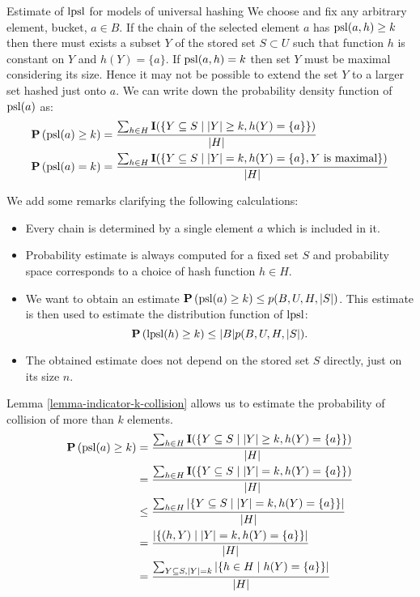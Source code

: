 \begin{section}{Estimate of $\mathrm{lpsl}$ for models of universal hashing}
We choose and fix any arbitrary element, bucket, $a \in B$. If the chain of the selected element $a$ has $\mathrm{psl}(a, h) \geq k$ then there must exists a subset $Y$ of the stored set $S \subset U$ such that function $h$ is constant on $Y$ and $h(Y) = \{ a \}$. If $\mathrm{psl}(a, h) = k$ then set $Y$ must be maximal considering its size. Hence it may not be possible to extend the set $Y$ to a larger set hashed just onto $a$. We can write down the probability density function of $\mathrm{psl}(a)$ as:
\begin{displaymath}
\begin{split}
\mathbf{P}\left(\mathrm{psl}(a) \geq k\right) & = \frac{\sum\displaylimits_{h \in H} \mathbf{I}(\{ Y \subseteq S \mid |Y| \geq k, h(Y) = \{ a \} \})}{|H|} \\
\mathbf{P}\left(\mathrm{psl}(a) = k\right) & = \frac{\sum\displaylimits_{h \in H} \mathbf{I}(\{ Y \subseteq S \mid |Y| = k, h(Y) = \{ a \}, Y \text{ is maximal} \})}{|H|} \\
\end{split}
\end{displaymath}

We add some remarks clarifying the following calculations:
\begin{itemize}
\item Every chain is determined by a single element $a$ which is included in it.
\item Probability estimate is always computed for a fixed set $S$ and probability space corresponds to a choice of hash function $h \in H$.
\item We want to obtain an estimate $\mathbf{P}\left(\mathrm{psl}(a) \geq k\right) \leq p(B, U, H, |S|)$. This estimate is then used to estimate the distribution function of $\mathrm{lpsl}$: \[ \mathbf{P}\left(\mathrm{lpsl}(h) \geq k\right) \leq |B| p(B, U, H, |S|) \text{.} \] 
\item The obtained estimate does not depend on the stored set $S$ directly, just on its size $n$.
\end{itemize}

Lemma \ref{lemma-indicator-k-collision} allows us to estimate the probability of collision of more than $k$ elements.
\begin{displaymath}
\begin{split}
\mathbf{P}\left(\mathrm{psl}(a) \geq k\right)
	& = \frac{\sum\displaylimits_{h \in H} \mathbf{I}(\{ Y \subseteq S \mid |Y| \geq k, h(Y) = \{ a \} \})}{|H|} \\
	& = \frac{\sum\displaylimits_{h \in H} \mathbf{I}(\{ Y \subseteq S \mid |Y| = k, h(Y) = \{ a \} \})}{|H|} \\
	& \leq \frac{\sum\displaylimits_{h \in H} |\{ Y \subseteq S \mid |Y| = k, h(Y) = \{ a \} \}|}{|H|} \\
	& = \frac{|\{ (h, Y) \mid |Y| = k, h(Y) = \{ a \} \}|}{|H|} \\
	& = \frac{\sum\displaylimits_{Y \subseteq S, |Y| = k} | \{ h \in H \mid h(Y) = \{a\} \}|}{|H|} \\
\end{split}
\end{displaymath}


\end{section}
